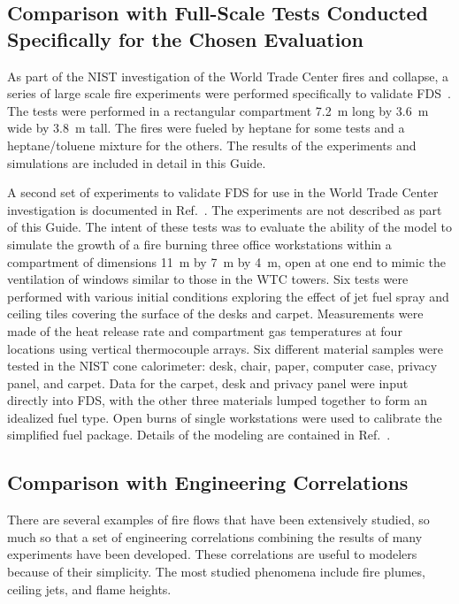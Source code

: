 \subsection{Comparison with Full-Scale Tests Conducted Specifically for the Chosen Evaluation}

As part of the NIST investigation  of the World Trade Center fires and collapse,  a series  of large  scale fire  experiments  were performed
specifically  to  validate  FDS~\cite{NIST_NCSTAR_1-5B}.   The  tests  were performed in  a rectangular  compartment 7.2~m long  by 3.6~m  wide by 3.8~m
tall.   The fires were  fueled by heptane  for some tests  and a heptane/toluene mixture  for the others.  The results of the experiments and simulations
are included in detail in this Guide.

A second set of experiments to validate FDS for use in the World Trade Center  investigation is  documented  in Ref.~\cite{NIST_NCSTAR_1-5E}.  The experiments
are not described as part of this Guide. The intent
of  these tests  was to  evaluate the ability  of the  model to simulate the growth  of a fire burning three  office workstations within a compartment of
dimensions 11~m by 7~m by 4~m, open at one end to mimic the ventilation  of windows similar to  those in  the WTC towers. Six tests  were performed
with various  initial conditions  exploring the effect of jet fuel spray and ceiling tiles covering the surface of the desks and carpet. Measurements
were  made of the heat release rate and compartment  gas   temperatures  at  four   locations  using  vertical thermocouple arrays. Six different
material samples were tested in the NIST  cone calorimeter:  desk,  chair, paper,  computer case,  privacy panel, and  carpet. Data for the  carpet,
desk and  privacy panel were input directly into FDS, with the other three materials lumped together to form an  idealized fuel type.  Open burns of
single  workstations were used to  calibrate the simplified fuel  package. Details of the modeling are contained in Ref.~\cite{NIST_NCSTAR_1-5F}.

\subsection{Comparison with Engineering Correlations}

There are  several examples of  fire flows that have  been extensively studied, so much  so that a set of  engineering correlations combining the
results  of   many  experiments   have  been   developed.  These correlations are  useful to modelers because of  their simplicity. The most studied
phenomena include fire  plumes, ceiling jets,  and flame heights.


